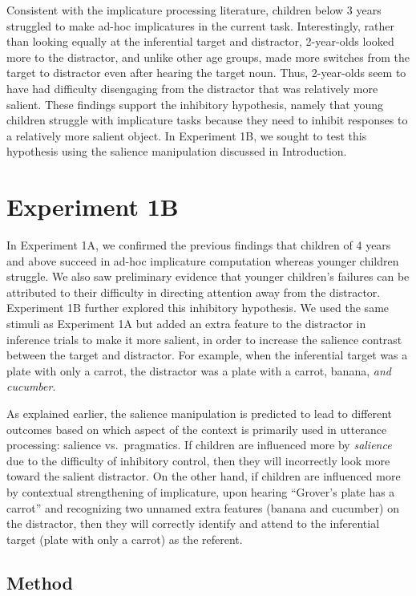 \documentclass{rsos}
\begin{document}
Consistent with the implicature processing literature, children below 3
years struggled to make ad-hoc implicatures in the current task.
Interestingly, rather than looking equally at the inferential target and
distractor, 2-year-olds looked more to the distractor, and unlike other
age groups, made more switches from the target to distractor even after
hearing the target noun. Thus, 2-year-olds seem to have had difficulty
disengaging from the distractor that was relatively more salient. These
findings support the inhibitory hypothesis, namely that young children
struggle with implicature tasks because they need to inhibit responses
to a relatively more salient object. In Experiment 1B, we sought to test
this hypothesis using the salience manipulation discussed in
Introduction.

\section{Experiment 1B}\label{experiment-1b}

In Experiment 1A, we confirmed the previous findings that children of 4
years and above succeed in ad-hoc implicature computation whereas
younger children struggle. We also saw preliminary evidence that younger
children's failures can be attributed to their difficulty in directing
attention away from the distractor. Experiment 1B further explored this
inhibitory hypothesis. We used the same stimuli as Experiment 1A but
added an extra feature to the distractor in inference trials to make it
more salient, in order to increase the salience contrast between the
target and distractor. For example, when the inferential target was a
plate with only a carrot, the distractor was a plate with a carrot,
banana, \emph{and cucumber}.

As explained earlier, the salience manipulation is predicted to lead to
different outcomes based on which aspect of the context is primarily
used in utterance processing: salience vs.~pragmatics. If children are
influenced more by \emph{salience} due to the difficulty of inhibitory
control, then they will incorrectly look more toward the salient
distractor. On the other hand, if children are influenced more by
contextual strengthening of implicature, upon hearing ``Grover's plate
has a carrot'' and recognizing two unnamed extra features (banana and
cucumber) on the distractor, then they will correctly identify and
attend to the inferential target (plate with only a carrot) as the
referent.

\subsection{Method}\label{method-1}
\end{document}
